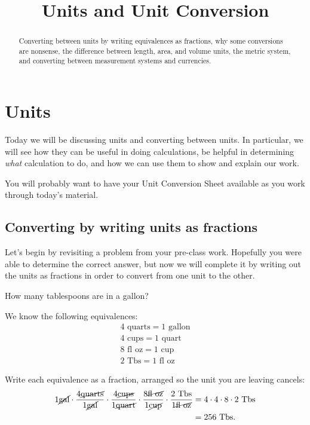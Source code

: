 \documentclass[12pt]{ximera}
\title{Units and Unit Conversion}
\begin{document}
\begin{abstract}
Converting between units by writing equivalences as fractions, why some conversions
are nonsense, the difference between length, area, and volume units, the metric
system, and converting between measurement systems and currencies.
\end{abstract}
\maketitle

\section*{Units}

Today we will be discussing units and converting between units. In particular, we
will see how they can be useful in doing calculations, be helpful in determining
\emph{what} calculation to do, and how we can use them to show and explain our work.

You will probably want to have your Unit Conversion Sheet available as you work
through today's material.

\subsection*{Converting by writing units as fractions}

Let's begin by revisiting a problem from your pre-class work. Hopefully you were able
to determine the correct answer, but now we will complete it by writing out the units
as fractions in order to convert from one unit to the other.

\begin{example}
How many tablespoons are in a gallon?

We know the following equivalences:
\[
\begin{array}{l}
4 \text{ quarts} = 1 \text{ gallon} \\
4 \text{ cups} = 1 \text{ quart} \\
8 \text{ fl oz} = 1 \text{ cup} \\
2 \text{ Tbs} = 1 \text{ fl oz}
\end{array}
\]

Write each equivalence as a fraction, arranged so the unit you are leaving cancels:
\[
\begin{aligned}
1 \cancel{\text{gal}} \cdot \frac{4 \cancel{\text{quarts}}}{1 \cancel{\text{gal}}}
\cdot \frac{4 \cancel{\text{cups}}}{1 \cancel{\text{quart}}}
\cdot \frac{8 \cancel{\text{fl oz}}}{1 \cancel{\text{cup}}}
\cdot \frac{2 \text{ Tbs}}{1 \cancel{\text{fl oz}}}
&= 4 \cdot 4 \cdot 8 \cdot 2 \text{ Tbs} \\
&= 256 \text{ Tbs}.
\end{aligned}
\]
\end{example}
\end{document}
